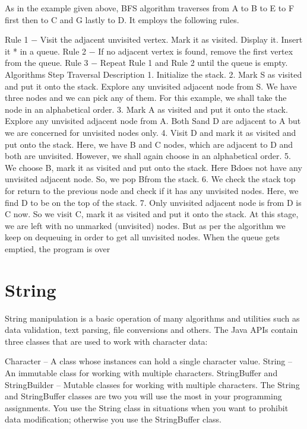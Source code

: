 As in the example given above, BFS algorithm traverses from A to B to E to F first then to C and G lastly to D. It employs the following rules.

Rule 1 − Visit the adjacent unvisited vertex. Mark it as visited. Display it. Insert it * in a queue.
Rule 2 − If no adjacent vertex is found, remove the first vertex from the queue.
Rule 3 − Repeat Rule 1 and Rule 2 until the queue is empty.
Algorithms
Step	Traversal	Description
1.		Initialize the stack.
2.		Mark S as visited and put it onto the stack. Explore any unvisited adjacent node from S. We have three nodes and we can pick any of them. For this example, we shall take the node in an alphabetical order.
3.		Mark A as visited and put it onto the stack. Explore any unvisited adjacent node from A. Both Sand D are adjacent to A but we are concerned for unvisited nodes only.
4.		Visit D and mark it as visited and put onto the stack. Here, we have B and C nodes, which are adjacent to D and both are unvisited. However, we shall again choose in an alphabetical order.
5.		We choose B, mark it as visited and put onto the stack. Here Bdoes not have any unvisited adjacent node. So, we pop Bfrom the stack.
6.		We check the stack top for return to the previous node and check if it has any unvisited nodes. Here, we find D to be on the top of the stack.
7.		Only unvisited adjacent node is from D is C now. So we visit C, mark it as visited and put it onto the stack.
At this stage, we are left with no unmarked (unvisited) nodes. But as per the algorithm we keep on dequeuing in order to get all unvisited nodes. When the queue gets emptied, the program is over

\section{String}

String manipulation is a basic operation of many algorithms and utilities such as data validation, text parsing, file conversions and others. The Java APIs contain three classes that are used to work with character data:

Character -- A class whose instances can hold a single character value.
String -- An immutable class for working with multiple characters.
StringBuffer and StringBuilder -- Mutable classes for working with multiple characters.
The String and StringBuffer classes are two you will use the most in your programming assignments. You use the String class in situations when you want to prohibit data modification; otherwise you use the StringBuffer class.

